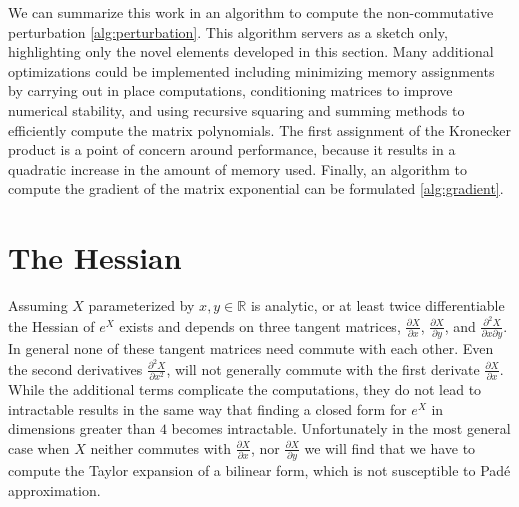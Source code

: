 We can summarize this work in an algorithm to compute the non-commutative perturbation \ref{alg:perturbation}.
This algorithm servers as a sketch only, highlighting only the novel elements developed in
this section. Many additional optimizations could be implemented including minimizing memory 
assignments by carrying out in place computations, conditioning matrices to improve
numerical stability, and using recursive squaring and summing methods to efficiently compute
the matrix polynomials. The first assignment of the Kronecker product is a point of concern
around performance, because it results in a quadratic increase in the amount of memory used. 
Finally, an algorithm to compute the gradient of the matrix exponential can be formulated \ref{alg:gradient}.
\section{The Hessian}
Assuming $X$ parameterized by $x,y \in \mathbb{R}$ is analytic, or at least twice 
differentiable the Hessian of $e^X$ exists and depends on three tangent matrices, $\frac{\partial X}{\partial x}$,
$\frac{\partial X}{\partial y}$, and $\frac{\partial^2 X}{\partial x \partial y}$. In 
general none of these tangent matrices need commute with each other. Even the second 
derivatives $\frac{\partial^2 X}{\partial x^2}$, will not generally commute with the first 
derivate $\frac{\partial X}{\partial x}$. While the additional terms complicate the 
computations, they do not lead to intractable results in the same way that finding a closed
form for $e^X$ in dimensions greater than $4$ becomes intractable. Unfortunately in the most 
general case when $X$ neither commutes with $\frac{\partial X}{\partial x}$, nor $\frac{\partial X}{\partial y}$ 
we will find that we have to compute the Taylor expansion of a bilinear form, which is not 
susceptible to Pad\'{e} approximation.

